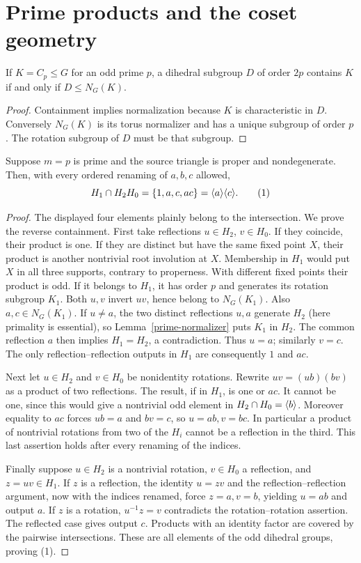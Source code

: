 \documentclass[11pt,a4paper]{article}
\begin{document}
\section{Prime products and the coset geometry}
\begin{lemma}\label{prime-normalizer}
If $K=C_p\le G$ for an odd prime $p$, a dihedral subgroup $D$ of order $2p$
contains $K$ if and only if $D\le N_G(K)$.
\end{lemma}
\begin{proof}
Containment implies normalization because $K$ is characteristic in $D$.
Conversely $N_G(K)$ is its torus normalizer and has a unique subgroup of
order $p$. The rotation subgroup of $D$ must be that subgroup.
\end{proof}

\begin{lemma}\label{product}
Suppose $m=p$ is prime and the source triangle is proper and nondegenerate.
Then, with every ordered renaming of $a,b,c$ allowed,
\[
 H_1\cap H_2H_0=\{1,a,c,ac\}=\langle a\rangle\langle c\rangle. \tag{1}
\]
\end{lemma}
\begin{proof}
The displayed four elements plainly belong to the intersection. We prove
the reverse containment. First take reflections $u\in H_2$, $v\in H_0$.
If they coincide, their product is one. If they are distinct but have the
same fixed point $X$, their product is another nontrivial root involution
at $X$. Membership in $H_1$ would put $X$ in all three supports, contrary
to properness. With different fixed points their product is odd. If it
belongs to $H_1$, it has order $p$ and generates its rotation subgroup $K_1$.
Both $u,v$ invert $uv$, hence belong to $N_G(K_1)$. Also $a,c\in N_G(K_1)$.
If $u\ne a$, the two distinct reflections $u,a$ generate $H_2$ (here
primality is essential), so Lemma~\ref{prime-normalizer} puts $K_1$ in $H_2$.
The common reflection $a$ then implies $H_1=H_2$, a contradiction. Thus
$u=a$; similarly $v=c$. The only reflection--reflection outputs in $H_1$
are consequently $1$ and $ac$.

Next let $u\in H_2$ and $v\in H_0$ be nonidentity rotations. Rewrite
$uv=(ub)(bv)$ as a product of two reflections. The result, if in $H_1$,
is one or $ac$. It cannot be one, since this would give a nontrivial odd
element in $H_2\cap H_0=\langle b\rangle$. Moreover equality to $ac$ forces
$ub=a$ and $bv=c$, so $u=ab,v=bc$. In particular a product of nontrivial
rotations from two of the $H_i$ cannot be a reflection in the third.
This last assertion holds after every renaming of the indices.

Finally suppose $u\in H_2$ is a nontrivial rotation, $v\in H_0$ a
reflection, and $z=uv\in H_1$. If $z$ is a reflection, the identity
$u=zv$ and the reflection--reflection argument, now with the indices
renamed, force $z=a,v=b$, yielding $u=ab$ and output $a$.
If $z$ is a rotation, $u^{-1}z=v$ contradicts the rotation--rotation
assertion. The reflected case gives output $c$. Products with an identity
factor are covered by the pairwise intersections. These are all elements
of the odd dihedral groups, proving (1).
\end{proof}
\end{document}
